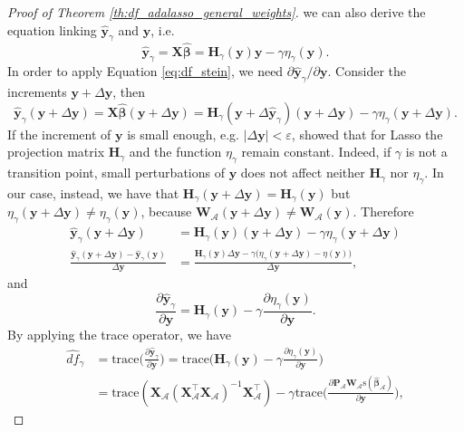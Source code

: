 \documentclass[a4paper, 12pt]{article}
\newcommand{\Aset}{\mathcal{A}}
\newcommand{\sgn}{\mathrm{s}}
\newcommand{\betahat}{\widehat{\boldsymbol\beta}}
\newcommand{\trace}{\mathrm{trace}}
\newcommand{\T}{\top}
\def\bbeta{\boldsymbol{\beta}}
\def\by{\boldsymbol{y}}
\def\bH{\mathbf{H}}
\def\bP{\mathbf{P}}
\def\bW{\mathbf{W}}
\def\bX{\mathbf{X}}
\def\by{\mathbf{y}}
\begin{document}
\begin{appendix}
\begin{proof}[Proof of Theorem \ref{th:df_adalasso_general_weights}]
we can also derive the equation linking $\widehat{\by}_\gamma$ and $\by$, i.e.
\begin{equation*}
\widehat{\by}_\gamma=\bX\betahat=\bH_\gamma(\by)\by-\gamma\eta_\gamma(\by).
\end{equation*}
In order to apply Equation \eqref{eq:df_stein}, we need $\partial \widehat{\by}_\gamma / \partial \by$. Consider the increments $\by+\Delta \by$,
then
\begin{equation*}
\widehat{\by}_\gamma(\by+\Delta\by)=\bX \widehat{\bbeta}(\by+\Delta \by)=\bH_\gamma(\by+\Delta \widehat{\by}_\gamma)(\by+\Delta \by)-\gamma \eta_\gamma(\by+\Delta\by). 
\end{equation*}
If the increment of $\by$ is small enough, e.g. $\vert\Delta \by \vert <\varepsilon$, \cite{zou2007} showed that for Lasso the projection matrix $\bH_\gamma$ and the function $\eta_\gamma$ remain constant. Indeed, if $\gamma$ is not a transition point, small perturbations of $\by$ does not affect neither $\bH_\gamma$ nor $\eta_\gamma$. In our case, instead, we have that $\bH_\gamma(\by+\Delta \by)=\bH_\gamma(\by)$ but $\eta_\gamma(\by+\Delta \by) \neq\eta_\gamma(\by)$, because $\bW_\Aset(\by+\Delta \by) \neq\bW_\Aset(\by)$.
Therefore
\begin{equation*}
\begin{aligned}
\widehat{\by}_\gamma(\by+\Delta\by) & =\bH_\gamma(\by)(\by+\Delta\by)-\gamma \eta_\gamma(\by+\Delta\by)\\
\frac{\widehat{\by}_\gamma(\by+\Delta\by)-\widehat{\by}_\gamma(\by)}{\Delta \by} & =\frac{\bH_\gamma(\by) \Delta \by-\gamma\big(\eta_\gamma(\by+\Delta\by)-\eta(\by)\big)}{\Delta \by},
\end{aligned}
\end{equation*}
and
\begin{equation}
\label{eq:H_minus_eta}
\frac{\partial \widehat{\by}_\gamma}{\partial \by}=\bH_\gamma(\by)-\gamma \frac{\partial\eta_\gamma(\by)}{\partial \by}.
\end{equation}
By applying the trace operator, we have
\begin{equation*}
\begin{aligned}
\widehat{df}_\gamma &= \trace\bigg(\frac{\partial \widehat{\by}_\gamma}{\partial \by}\bigg) = \trace \bigg( \bH_\gamma(\by)-\gamma \frac{\partial\eta_\gamma(\by)}{\partial \by} \bigg)\\
&= \trace(\bX_{\Aset}(\bX_{\Aset}^{\T}\bX_{\Aset})^{-1} \bX_{\Aset}^{\T}) - \gamma \trace \bigg( \frac{\partial\bP_{\Aset}\bW_{\Aset}\sgn(\widehat{\bbeta}_{\Aset})}{\partial \by} \bigg),

\end{aligned}
\end{equation*}
\end{proof}
\end{appendix}
\end{document}
